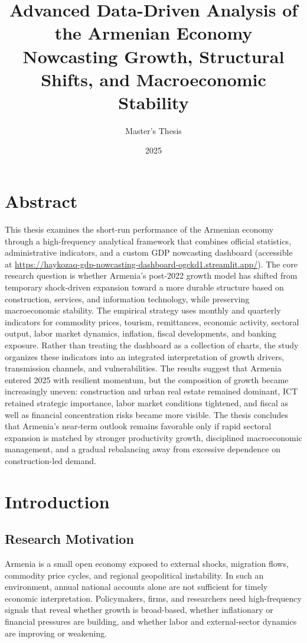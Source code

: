 \documentclass[12pt,a4paper]{report}
\title{Advanced Data-Driven Analysis of the Armenian Economy \\ \large Nowcasting Growth, Structural Shifts, and Macroeconomic Stability}
\author{Master's Thesis}
\date{2025}
\begin{document}
\maketitle
\tableofcontents

\chapter*{Abstract}
This thesis examines the short-run performance of the Armenian economy through a high-frequency analytical framework that combines official statistics, administrative indicators, and a custom GDP nowcasting dashboard (accessible at \url{https://haykozaq-gdp-nowcasting-dashboard-ogckd1.streamlit.app/}). The core research question is whether Armenia's post-2022 growth model has shifted from temporary shock-driven expansion toward a more durable structure based on construction, services, and information technology, while preserving macroeconomic stability. The empirical strategy uses monthly and quarterly indicators for commodity prices, tourism, remittances, economic activity, sectoral output, labor market dynamics, inflation, fiscal developments, and banking exposure. Rather than treating the dashboard as a collection of charts, the study organizes these indicators into an integrated interpretation of growth drivers, transmission channels, and vulnerabilities. The results suggest that Armenia entered 2025 with resilient momentum, but the composition of growth became increasingly uneven: construction and urban real estate remained dominant, ICT retained strategic importance, labor market conditions tightened, and fiscal as well as financial concentration risks became more visible. The thesis concludes that Armenia's near-term outlook remains favorable only if rapid sectoral expansion is matched by stronger productivity growth, disciplined macroeconomic management, and a gradual rebalancing away from excessive dependence on construction-led demand.

\chapter{Introduction}
\section{Research Motivation}
Armenia is a small open economy exposed to external shocks, migration flows, commodity price cycles, and regional geopolitical instability. In such an environment, annual national accounts alone are not sufficient for timely economic interpretation. Policymakers, firms, and researchers need high-frequency signals that reveal whether growth is broad-based, whether inflationary or financial pressures are building, and whether labor and external-sector dynamics are improving or weakening.
\end{document}
